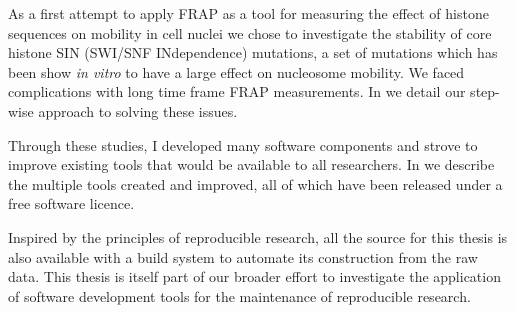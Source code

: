   As a first attempt to apply FRAP as a tool for measuring the effect of
  histone sequences on mobility in cell nuclei we chose to investigate
  the stability of core histone SIN (SWI/SNF INdependence) mutations,
  a set of mutations which has been show \textit{in vitro} to have a
  large effect on nucleosome mobility.
  We faced complications with
  long time frame FRAP measurements.  In  we detail our
  step-wise approach to solving these issues.

  Through these studies, I developed many software components and
  strove to improve existing tools that would be available to all
  researchers.  In  we describe the multiple tools
  created and improved, all of which have been released under a free
  software licence.

  Inspired by the principles of reproducible research, all the source
  for this thesis is also available with a build system to automate its
  construction from the raw data.  This thesis is itself part of our
  broader effort to investigate
  the application of software development tools for the maintenance of
  reproducible research.
